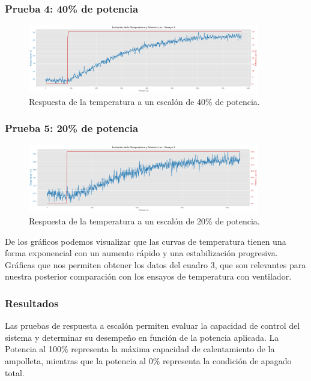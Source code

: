 \documentclass[spanish, a4paper, 11pt]{article}
\begin{document}
\newpage
\subsubsection{Prueba 4: 40\% de potencia}

\begin{figure}[ht]
    \centering
    \includegraphics[width=0.9\textwidth]{./figures/prueba4.png}
    \caption{Respuesta de la temperatura a un escalón de 40\% de potencia.}
\end{figure}
\FloatBarrier

\subsubsection{Prueba 5: 20\% de potencia}

\begin{figure}[ht]
    \centering
    \includegraphics[width=0.9\textwidth]{./figures/prueba5.png}
    \caption{Respuesta de la temperatura a un escalón de 20\% de potencia.}
\end{figure}
\FloatBarrier

De los gráficos podemos visualizar que las curvas de temperatura tienen una forma exponencial con un aumento rápido y una estabilización progresiva. Gráficas que nos permiten obtener los datos del cuadro 3, que son relevantes para nuestra posterior comparación con los ensayos de temperatura con ventilador.


\subsubsection{Resultados}

Las pruebas de respuesta a escalón permiten evaluar la capacidad de control del sistema y determinar su desempeño en función de la potencia aplicada. La Potencia al 100\% representa la máxima capacidad de calentamiento de la ampolleta, mientras que la potencia al 0\% representa la condición de apagado total. 
\end{document}
